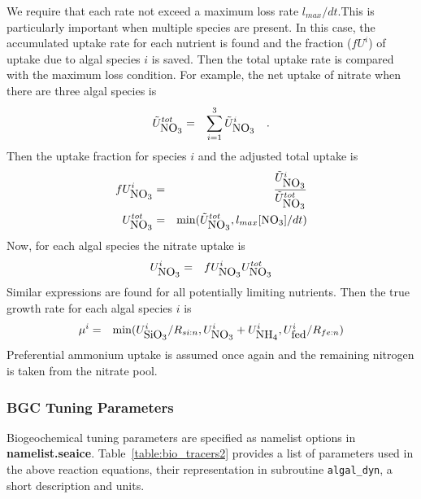 We require that each rate not exceed a maximum loss rate
$l_{max}/dt$.This is particularly important when multiple species are present.
In this case, the accumulated uptake rate for each nutrient is found and the fraction ($fU^i$) of uptake due to algal species $i$ is
saved. Then the total uptake rate is compared with the maximum loss
condition.
For example, the net uptake of nitrate when there are three algal species is
\begin{eqnarray}
\tilde{U}^{tot}_{\mbox{NO$_3$}} & = & \sum^{3}_{i=1}\tilde{U}^i_{\mbox{NO$_3$}}\ \ \ . \nonumber
\end{eqnarray}
Then the uptake fraction for species $i$ and the adjusted total uptake is
\begin{eqnarray}
fU^i_{\mbox{NO$_3$}} & = & \frac{\tilde{U}^i_{\mbox{NO$_3$}}}{\tilde{U}^{tot}_{\mbox{NO$_3$}}} \nonumber \\
U^{tot}_{\mbox{NO$_3$}} & = & \min(\tilde{U}^{tot}_{\mbox{NO$_3$}}, l_{max}[\mbox{NO$_3$}]/dt)
\end{eqnarray}
Now, for each algal species the nitrate uptake is
\begin{eqnarray}
U^i_{\mbox{NO$_3$}} & = & fU^i_{\mbox{NO$_3$}} U^{tot}_{\mbox{NO$_3$}}
\end{eqnarray}
Similar expressions are found for all potentially limiting nutrients.
Then the true growth rate for each algal species $i$ is
\begin{eqnarray}
\mu^i & = & \min(U^i_{\mbox{SiO$_3$}}/R_{si:n}, U^i_{\mbox{NO$_3$}} + U^i_{\mbox{NH$_4$}}, U^i_{\mbox{fed}}/R_{fe:n})
\end{eqnarray}
Preferential ammonium uptake is assumed once again and the remaining nitrogen
is taken from the nitrate pool.

\subsubsection{BGC Tuning Parameters}
Biogeochemical tuning parameters are specified as namelist options in
{\bf namelist.seaice}.  Table~\ref{table:bio_tracers2} provides a list of
parameters used in the above reaction equations, their representation in subroutine
{\tt algal\_dyn}, a short description and units.

